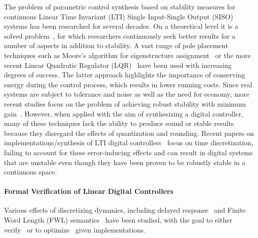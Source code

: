 \documentclass[final]{sig-alternate-05-2015}
\begin{document}
The problem of parametric control synthesis based on stability measures for
continuous Linear Time Invariant (LTI) Single Input-Single Output (SISO)
systems has been researched for several decades.  On a theoretical level it
is a solved problem~\cite{wonham1967pole}, for which researchers
continuously seek better results for a number of aspects in addition to
stability.  A vast range of pole placement techniques such as Moore's
algorithm for eigenstructure assignment~\cite{klein1977eigenvalue} or the
more recent Linear Quadratic Regulator (LQR)~\cite{bemporad2002explicit}
have been used with increasing degrees of success.  The latter approach
highlights the importance of conserving energy during the control process,
which results in lower running costs.  Since real systems are subject to
tolerance and noise as well as the need for economy, more recent studies
focus on the problem of achieving robust stability with minimum
gain~\cite{schmid2014unified, konigorski2012pole}.  However, when applied
with the aim of synthesizing a digital controller, many of these techniques
lack the ability to produce sound or stable results because they disregard
the effects of quantization and rounding.  Recent papers on
implementations/synthesis of LTI digital controllers~\cite{das2013lqr,
ghosh2013fpga} focus on time discretization, failing to account for these
error-inducing effects and can result in digital systems that are unstable
even though they have been proven to be robustly stable in a continuous
space.

\paragraph{Formal Verification of Linear Digital Controllers} 

Various effects of discretizing dynamics, including delayed
response~\cite{Duggirala2015} and Finite Word Length (FWL)
semantics~\cite{Anta:2010:AVC:1879021.1879024} have been studied, with the
goal to either verify~\cite{daes20161} or to
optimize~\cite{oudjida2014design} given implementations.
\end{document}

